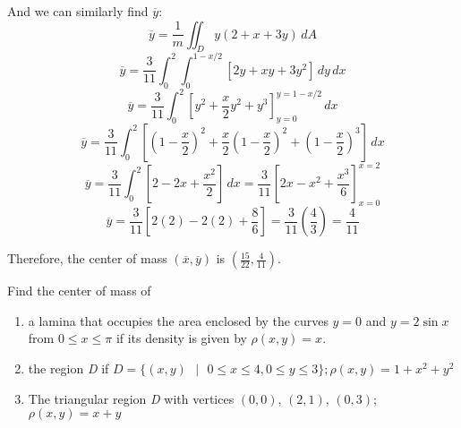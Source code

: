 And we can similarly find $\overline{y}$:
$$\overline{y} = \frac{1}{m} \iint_{\textit{D}} y \left(2 + x + 3y \right)
\,dA$$
$$\overline{y} = \frac{3}{11} \int_0^2 \int_0^{1 - x/2} \left[ 2y + xy + 3y^2 
\right]\,dy\,dx$$
$$\overline{y} = \frac{3}{11} \int_0^2 \left[ y^2 + \frac{x}{2}y^2 + y^3 
\right]_{y = 0}^{y = 1 - x/2} \,dx$$
$$\overline{y} = \frac{3}{11} \int_0^2 \left[ \left(1 - \frac{x}{2} \right)^2 
+ \frac{x}{2} \left( 1 - \frac{x}{2} \right)^2 + \left( 1 - \frac{x}{2} \right)
^3 \right] \,dx$$
$$\overline{y} = \frac{3}{11} \int_0^2 \left[ 2 - 2x + \frac{x^2}{2} \right]
\,dx = \frac{3}{11} \left[ 2x - x^2 + \frac{x^3}{6} \right]_{x = 0}^{x = 2}$$
$$\overline{y} = \frac{3}{11} \left[ 2(2) - 2(2) + \frac{8}{6} \right] = \frac{
3}{11} \left( \frac{4}{3} \right) = \frac{4}{11}$$

Therefore, the center of mass $(\overline{x}, \overline{y})$ is $(\frac{15}{22
}, \frac{4}{11})$.

\begin{Exercise}[title = {Center of Mass}, label = c_of_m]
Find the center of mass of 
\begin{enumerate}
\item a lamina that occupies the area enclosed by the 
curves $y = 0$ and $y = 2\sin{x}$ from $0 \leq x \leq \pi$ if its density is 
given by $\rho (x,y) = x$.
\item the region \textit{D} if $\textit{D} = \{(x, y)\text{ }|\text{ } 0 \leq x
\leq 4, 0 \leq y \leq 3 \}; \rho (x, y) = 1 + x^2 + y^2$
\item The triangular region \textit{D} with vertices $(0, 0)$, $(2, 1)$, 
$(0, 3)$; $\rho (x, y) = x + y$
\end{enumerate}
\vspace{100mm}
\end{Exercise}

